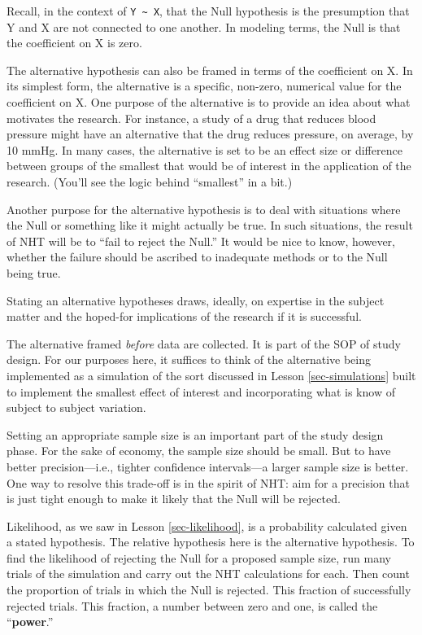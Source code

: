 \documentclass[
  letterpaper,
  DIV=11,
  numbers=noendperiod,
  oneside]{scrartcl}
\begin{document}
Recall, in the context of \texttt{Y\ \textasciitilde{}\ X}, that the
Null hypothesis is the presumption that Y and X are not connected to one
another. In modeling terms, the Null is that the coefficient on X is
zero.

The alternative hypothesis can also be framed in terms of the
coefficient on X. In its simplest form, the alternative is a specific,
non-zero, numerical value for the coefficient on X. One purpose of the
alternative is to provide an idea about what motivates the research. For
instance, a study of a drug that reduces blood pressure might have an
alternative that the drug reduces pressure, on average, by 10 mmHg. In
many cases, the alternative is set to be an effect size or difference
between groups of the smallest that would be of interest in the
application of the research. (You'll see the logic behind ``smallest''
in a bit.)

Another purpose for the alternative hypothesis is to deal with
situations where the Null or something like it might actually be true.
In such situations, the result of NHT will be to ``fail to reject the
Null.'' It would be nice to know, however, whether the failure should be
ascribed to inadequate methods or to the Null being true.

Stating an alternative hypotheses draws, ideally, on expertise in the
subject matter and the hoped-for implications of the research if it is
successful.

The alternative framed \emph{before} data are collected. It is part of
the SOP of study design. For our purposes here, it suffices to think of
the alternative being implemented as a simulation of the sort discussed
in Lesson \ref{sec-simulations} built to implement the smallest effect
of interest and incorporating what is know of subject to subject
variation.

Setting an appropriate sample size is an important part of the study
design phase. For the sake of economy, the sample size should be small.
But to have better precision---i.e., tighter confidence intervals---a
larger sample size is better. One way to resolve this trade-off is in
the spirit of NHT: aim for a precision that is just tight enough to make
it likely that the Null will be rejected.

Likelihood, as we saw in Lesson \ref{sec-likelihood}, is a probability
calculated given a stated hypothesis. The relative hypothesis here is
the alternative hypothesis. To find the likelihood of rejecting the Null
for a proposed sample size, run many trials of the simulation and carry
out the NHT calculations for each. Then count the proportion of trials
in which the Null is rejected. This fraction of successfully rejected
trials. This fraction, a number between zero and one, is called the
``\textbf{power}.''
\end{document}
